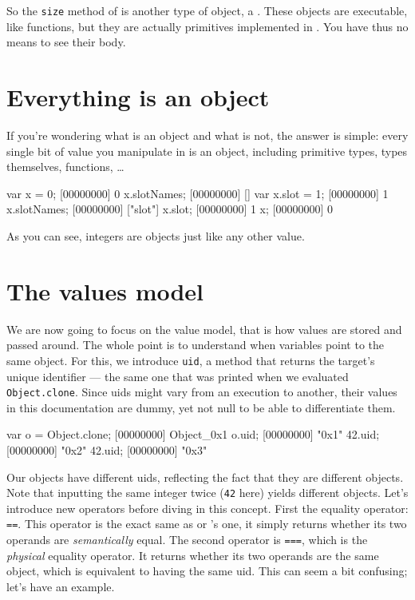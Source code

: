 So the \lstinline{size} method of  is another type
of object, a . These objects are executable, like
functions, but they are actually primitives implemented in \Cxx. You
have thus no means to see their body.

\section{Everything is an object}

If you're wondering what is an object and what is not, the answer is
simple: every single bit of value you manipulate in \us is an
object, including primitive types, types themselves, functions, \ldots

\begin{urbiscript}
var x = 0;
[00000000] 0
x.slotNames;
[00000000] []
var x.slot = 1;
[00000000] 1
x.slotNames;
[00000000] ["slot"]
x.slot;
[00000000] 1
x;
[00000000] 0
\end{urbiscript}

As you can see, integers are objects just like any other value.

\section{The \us values model}

We are now going to focus on the \us value model, that is how values
are stored and passed around. The whole point is to understand when
variables point to the same object.  For this, we introduce
\lstinline{uid}, a method that returns the target's unique identifier
--- the same one that was printed when we evaluated
\lstinline|Object.clone|.  Since uids might vary from an execution to
another, their values in this documentation are dummy, yet not null to
be able to differentiate them.

\begin{urbiscript}
var o = Object.clone;
[00000000] Object_0x1
o.uid;
[00000000] "0x1"
42.uid;
[00000000] "0x2"
42.uid;
[00000000] "0x3"
\end{urbiscript}

Our objects have different uids, reflecting the fact that they are
different objects. Note that inputting the same integer twice
(\lstinline{42} here) yields different objects. Let's introduce new
operators before diving in this concept. First the equality operator:
\lstinline{==}. This operator is the exact same as \C or \Cxx's one,
it simply returns whether its two operands are \emph{semantically}
equal. The second operator is \lstinline{===}, which is the
\emph{physical} equality operator. It returns whether its two operands
are the same object, which is equivalent to having the same uid. This
can seem a bit confusing; let's have an example.

